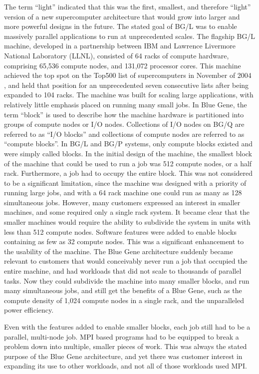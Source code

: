 The term ``light'' indicated that this was the first, smallest, and therefore ``light'' version of a
new supercomputer architecture that would grow into larger and more powerful designs in the future.
The stated goal of BG/L was to enable massively parallel applications to run at unprecedented
scales. The flagship BG/L machine, developed in a partnership between IBM and Lawrence Livermore
National Laboratory (LLNL), consisted of 64 racks of compute hardware, comprising 65,536 compute
nodes, and 131,072 processor cores. This machine achieved the top spot on the Top500 list of
supercomputers in November of 2004 \cite{website:top500November2004}, and held that position for an
unprecedented seven consecutive lists after being expanded to 104 racks. The machine was built for
scaling large applications, with relatively little emphasis placed on running many small jobs. In
Blue Gene, the term ``block'' is used to describe how the machine hardware is partitioned into
groups of compute nodes or I/O nodes. Collections of I/O nodes on BG/Q are referred to as ``I/O
blocks'' and collections of compute nodes are referred to as ``compute blocks''. In BG/L and BG/P
systems, only compute blocks existed and were simply called blocks. In
the initial design of the machine, the smallest block of the machine that could be used to run a job
was 512 compute nodes, or a half rack. Furthermore, a job had to occupy the entire block. This was
not considered to be a significant limitation, since the machine was designed with a priority of
running large jobs, and with a 64 rack machine one could run as many as 128 simultaneous jobs.
However, many customers expressed an interest in smaller machines, and some required only a single
rack system. It became clear that the smaller machines would require the ability to subdivide the
system in units with less than 512 compute nodes.  Software features were added to enable blocks
containing as few as 32 compute nodes. This was a significant enhancement to the usability of the
machine. The Blue Gene architecture suddenly became relevant to customers that would conceivably
never run a job that occupied the entire machine, and had workloads that did not scale to thousands
of parallel tasks. Now they could subdivide the machine into many smaller blocks, and run many
simultaneous jobs, and still get the benefits of a Blue Gene, such as the compute density of 1,024
compute nodes in a single rack, and the unparalleled power efficiency.

Even with the features added to enable smaller blocks, each job still had to be a parallel,
multi-node job. MPI based programs had to be equipped to break a problem down into multiple, smaller
pieces of work. This was always the stated purpose of the Blue Gene architecture, and yet there was
customer interest in expanding its use to other workloads, and not all of those workloads used MPI.

